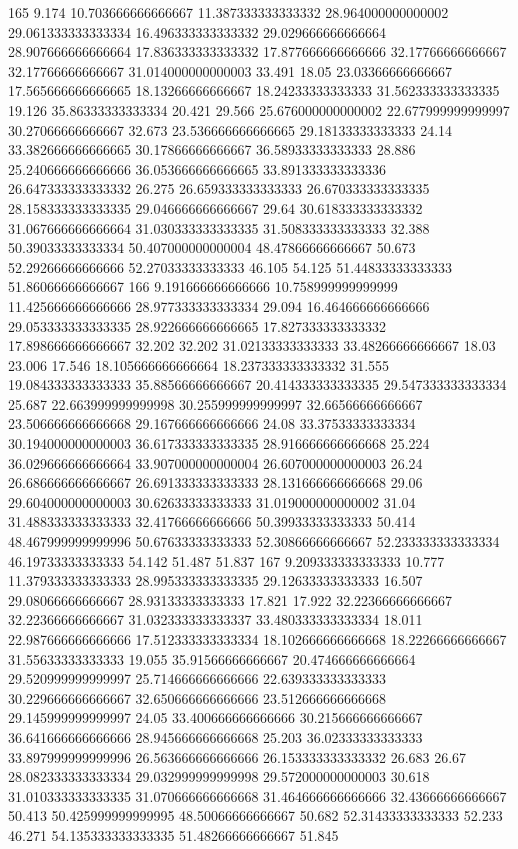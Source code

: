 165 9.174 10.703666666666667 11.387333333333332 28.964000000000002 29.061333333333334 16.496333333333332 29.029666666666664 28.907666666666664 17.836333333333332 17.877666666666666 32.17766666666667 32.17766666666667 31.014000000000003 33.491 18.05 23.03366666666667 17.565666666666665 18.13266666666667 18.24233333333333 31.562333333333335 19.126 35.86333333333334 20.421 29.566 25.676000000000002 22.677999999999997 30.27066666666667 32.673 23.536666666666665 29.18133333333333 24.14 33.382666666666665 30.17866666666667 36.58933333333333 28.886 25.240666666666666 36.053666666666665 33.891333333333336 26.647333333333332 26.275 26.659333333333333 26.670333333333335 28.158333333333335 29.046666666666667 29.64 30.618333333333332 31.067666666666664 31.030333333333335 31.508333333333333 32.388 50.39033333333334 50.407000000000004 48.47866666666667 50.673 52.29266666666666 52.27033333333333 46.105 54.125 51.44833333333333 51.86066666666667
166 9.191666666666666 10.758999999999999 11.425666666666666 28.977333333333334 29.094 16.464666666666666 29.053333333333335 28.922666666666665 17.827333333333332 17.898666666666667 32.202 32.202 31.02133333333333 33.48266666666667 18.03 23.006 17.546 18.105666666666664 18.237333333333332 31.555 19.084333333333333 35.88566666666667 20.414333333333335 29.547333333333334 25.687 22.663999999999998 30.255999999999997 32.66566666666667 23.506666666666668 29.167666666666666 24.08 33.37533333333334 30.194000000000003 36.617333333333335 28.916666666666668 25.224 36.029666666666664 33.907000000000004 26.607000000000003 26.24 26.686666666666667 26.691333333333333 28.131666666666668 29.06 29.604000000000003 30.62633333333333 31.019000000000002 31.04 31.488333333333333 32.41766666666666 50.39933333333333 50.414 48.467999999999996 50.67633333333333 52.30866666666667 52.233333333333334 46.19733333333333 54.142 51.487 51.837
167 9.209333333333333 10.777 11.379333333333333 28.995333333333335 29.12633333333333 16.507 29.08066666666667 28.93133333333333 17.821 17.922 32.22366666666667 32.22366666666667 31.032333333333337 33.480333333333334 18.011 22.987666666666666 17.512333333333334 18.102666666666668 18.22266666666667 31.55633333333333 19.055 35.91566666666667 20.474666666666664 29.520999999999997 25.714666666666666 22.639333333333333 30.229666666666667 32.650666666666666 23.512666666666668 29.145999999999997 24.05 33.400666666666666 30.215666666666667 36.641666666666666 28.945666666666668 25.203 36.02333333333333 33.897999999999996 26.563666666666666 26.153333333333332 26.683 26.67 28.082333333333334 29.032999999999998 29.572000000000003 30.618 31.010333333333335 31.070666666666668 31.464666666666666 32.43666666666667 50.413 50.425999999999995 48.50066666666667 50.682 52.31433333333333 52.233 46.271 54.135333333333335 51.48266666666667 51.845
